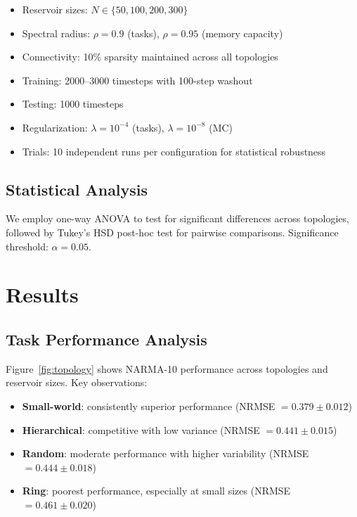 \documentclass{article}
\begin{document}
\begin{itemize}
\item Reservoir sizes: $N \in \{50, 100, 200, 300\}$
\item Spectral radius: $\rho = 0.9$ (tasks), $\rho = 0.95$ (memory capacity)
\item Connectivity: 10\% sparsity maintained across all topologies
\item Training: 2000–3000 timesteps with 100-step washout
\item Testing: 1000 timesteps
\item Regularization: $\lambda = 10^{-4}$ (tasks), $\lambda = 10^{-8}$ (MC)
\item Trials: 10 independent runs per configuration for statistical robustness
\end{itemize}

\subsection{Statistical Analysis}

We employ one-way ANOVA to test for significant differences across topologies, followed by Tukey's HSD post-hoc test for pairwise comparisons. Significance threshold: $\alpha = 0.05$.

\section{Results}

\subsection{Task Performance Analysis}

Figure~\ref{fig:topology} shows NARMA-10 performance across topologies and reservoir sizes. Key observations:

\begin{itemize}
\item \textbf{Small-world}: consistently superior performance (NRMSE $= 0.379 \pm 0.012$)
\item \textbf{Hierarchical}: competitive with low variance (NRMSE $= 0.441 \pm 0.015$)
\item \textbf{Random}: moderate performance with higher variability (NRMSE $= 0.444 \pm 0.018$)
\item \textbf{Ring}: poorest performance, especially at small sizes (NRMSE $= 0.461 \pm 0.020$)
\end{itemize}
\end{document}

